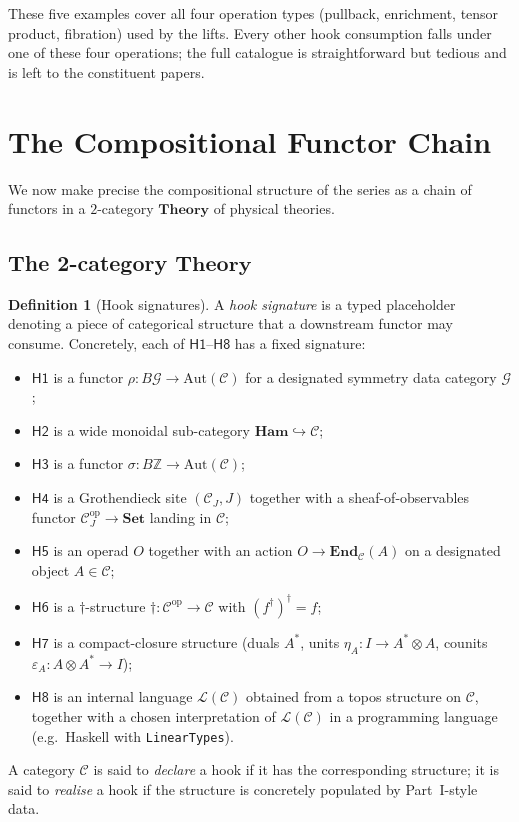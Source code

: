\documentclass[12pt]{article}
\theoremstyle{definition}
\newtheorem{definition}[theorem]{Definition}
\theoremstyle{remark}
\newcommand{\C}{\mathcal{C}}
\newcommand{\Set}{\mathbf{Set}}
\newcommand{\Ham}{\mathbf{Ham}}
\newcommand{\Theory}{\mathbf{Theory}}
\newcommand{\op}{\mathrm{op}}
\newcommand{\Z}{\mathbb{Z}}
\begin{document}
\smallskip

These five examples cover all four operation types (pullback,
enrichment, tensor product, fibration) used by the lifts. Every other
hook consumption falls under one of these four operations; the full
catalogue is straightforward but tedious and is left to the constituent
papers.

\section{The Compositional Functor Chain}
\label{sec:functor-chain}

We now make precise the compositional structure of the series as a chain of
functors in a $2$-category $\Theory$ of physical theories.

\subsection{The 2-category $\Theory$}

\begin{definition}[Hook signatures]
\label{def:hook-sig}
A \emph{hook signature} is a typed placeholder denoting a piece of
categorical structure that a downstream functor may consume. Concretely,
each of $\mathsf{H1}$--$\mathsf{H8}$ has a fixed signature:
\begin{itemize}[leftmargin=2em]
\item $\mathsf{H1}$ is a functor $\rho : B\mathcal{G} \to \mathrm{Aut}(\C)$
  for a designated symmetry data category $\mathcal{G}$;
\item $\mathsf{H2}$ is a wide monoidal sub-category $\Ham
  \hookrightarrow \C$;
\item $\mathsf{H3}$ is a functor $\sigma : B\Z \to \mathrm{Aut}(\C)$;
\item $\mathsf{H4}$ is a Grothendieck site $(\C_J, J)$ together with a
  sheaf-of-observables functor $\C_J^{\op} \to \Set$ landing in $\C$;
\item $\mathsf{H5}$ is an operad $O$ together with an action $O \to
  \mathbf{End}_\C(A)$ on a designated object $A \in \C$;
\item $\mathsf{H6}$ is a $\dagger$-structure $\dagger : \C^{\op} \to \C$
  with $(f^\dagger)^\dagger = f$;
\item $\mathsf{H7}$ is a compact-closure structure (duals $A^*$, units
  $\eta_A : I \to A^* \otimes A$, counits $\varepsilon_A : A \otimes A^*
  \to I$);
\item $\mathsf{H8}$ is an internal language $\mathcal{L}(\C)$ obtained
  from a topos structure on $\C$, together with a chosen interpretation
  of $\mathcal{L}(\C)$ in a programming language (e.g.\ Haskell with
  \texttt{LinearTypes}).
\end{itemize}
A category $\C$ is said to \emph{declare} a hook if it has the
corresponding structure; it is said to \emph{realise} a hook if the
structure is concretely populated by Part~I-style data.
\end{definition}
\end{document}
